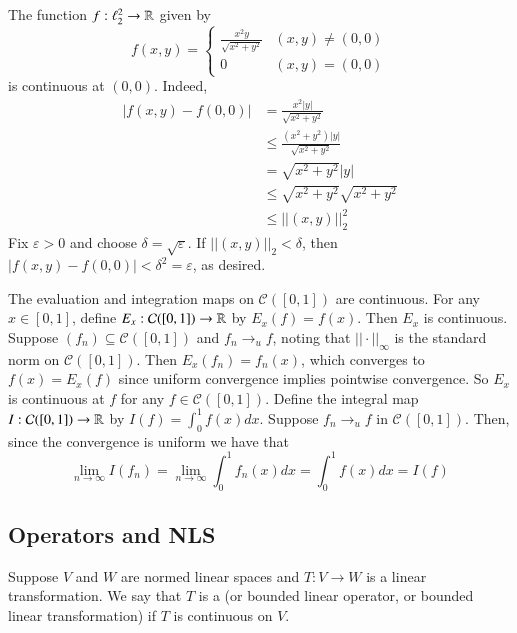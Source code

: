 \begin{eg}
    The function $f:\ell_2^2\rightarrow \mathbb R$ given by $$f(x,y) = \left\{\begin{array}{cc} \frac{x^2y}{\sqrt{x^2+y^2}} & (x,y)\neq (0,0) \\ 0 & (x,y) = (0,0) \end{array}\right.$$ is continuous at $(0,0)$. Indeed, \begin{align*}
        |f(x,y) - f(0,0)| &= \frac{x^2|y|}{\sqrt{x^2+y^2}} \\
        &\leq \frac{(x^2+y^2)|y|}{\sqrt{x^2+y^2}} \\
        &= \sqrt{x^2+y^2}|y| \\
        &\leq \sqrt{x^2+y^2}\sqrt{x^2+y^2} \\
        &\leq ||(x,y)||_2^2
    \end{align*}
    Fix $\varepsilon > 0$ and choose $\delta = \sqrt{\varepsilon}$. If $||(x,y)||_2 < \delta$, then $|f(x,y) - f(0,0)| < \delta^2 = \varepsilon$, as desired.
\end{eg}

\begin{eg}
    The evaluation and integration maps on $\mathcal{C}([0,1])$ are continuous. For any $x \in [0,1]$, define $E_x:\mathcal{C}([0,1])\rightarrow \mathbb R$ by $E_x(f) = f(x)$. Then $E_x$ is continuous. Suppose $(f_n) \subseteq \mathcal{C}([0,1])$ and $f_n\rightarrow_uf$, noting that $||\cdot||_{\infty}$ is the standard norm on $\mathcal{C}([0,1])$. Then $E_x(f_n) = f_n(x)$, which converges to $f(x) = E_x(f)$ since uniform convergence implies pointwise convergence. So $E_x$ is continuous at $f$ for any $f \in \mathcal{C}([0,1])$. Define the integral map $I:\mathcal{C}([0,1])\rightarrow \mathbb R$ by $I(f) = \int_0^1f(x)dx$. Suppose $f_n\rightarrow_uf$ in $\mathcal{C}([0,1])$. Then, since the convergence is uniform we have that $$\lim\limits_{n\rightarrow \infty}I(f_n) = \lim\limits_{n\rightarrow \infty}\int_0^1f_n(x)dx = \int_0^1f(x)dx = I(f)$$
\end{eg}


\subsection{Operators and NLS}

\begin{defn}
    Suppose $V$ and $W$ are normed linear spaces and $T:V\rightarrow W$ is a linear transformation. We say that $T$ is a  (or bounded linear operator, or bounded linear transformation) if $T$ is continuous on $V$.
\end{defn}

